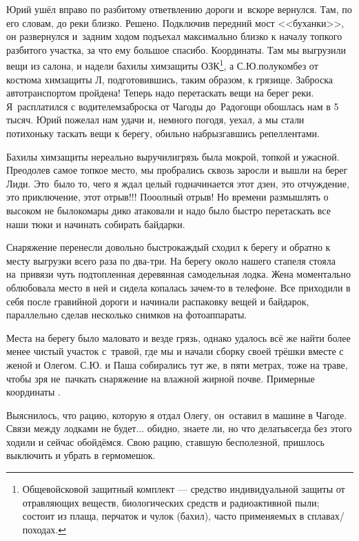 \renewcommand*{\thefootnote}{\fnsymbol{footnote}}
Юрий ушёл вправо по разбитому ответвлению дороги и~вскоре вернулся. Там, по его словам, до реки близко. Решено. Подключив передний мост <<буханки>>, он развернулся и~задним ходом подъехал максимально близко к началу топкого разбитого участка, за что ему большое спасибо. Координаты\mdash \CoordsLidSeventeenStapel. Там мы выгрузили вещи из салона, и надели бахилы химзащиты ОЗК\footnote[1]{Общевойсковой защитный комплект --- средство индивидуальной защиты от отравляющих веществ, биологических средств и радиоактивной пыли; состоит из плаща, перчаток и чулок (бахил), часто применяемых в сплавах/походах.}, а С.Ю.\mdash полукомбез от костюма химзащиты Л, подготовившись, таким образом, к грязище. Заброска автотранспортом пройдена! Теперь надо перетаскать вещи на берег реки. Я~расплатился с водителем\mdash заброска от Чагоды до~Радогощи обошлась нам в 5 тысяч. Юрий пожелал нам удачи и, немного погодя, уехал, а мы стали потихоньку таскать вещи к берегу, обильно набрызгавшись репеллентами.

Бахилы химзащиты нереально выручили\mdash грязь была мокрой, топкой и ужасной. Преодолев самое топкое место, мы пробрались сквозь заросли и вышли на берег Лиди. Это~было то, чего я ждал целый год\mdash начинается этот дзен, это отчуждение, это приключение, этот отрыв!!! По\sdash о\sdash олный отрыв! Но времени размышлять о высоком не было\mdash комары дико атаковали и надо было быстро перетаскать все наши тюки и начинать собирать байдарки. 

Снаряжение перенесли довольно быстро\mdash каждый сходил к берегу и обратно к месту выгрузки всего раза по два-три. На берегу около нашего стапеля стояла на~привязи чуть подтопленная деревянная самодельная лодка. Жена моментально облюбовала место в ней и сидела копалась зачем-то в телефоне. Все приходили в себя после гравийной дороги и начинали распаковку вещей и байдарок, параллельно сделав несколько снимков на фотоаппараты. 

Места на берегу было маловато и везде грязь, однако удалось всё же найти более менее чистый участок с~травой, где мы и начали сборку своей трёшки вместе с женой и Олегом. С.Ю. и Паша собирались тут же, в пяти метрах, тоже на траве, чтобы зря не~пачкать снаряжение на влажной жирной почве. Примерные координаты \CoordsLidSeventeenStapel.

Выяснилось, что рацию, которую я отдал Олегу, он~оставил в машине в Чагоде. Связи между лодками не будет$\ldots$ обидно, знаете ли, но что делать\mdash всегда без этого ходили и сейчас обойдёмся. Свою рацию, ставшую бесполезной, пришлось выключить и убрать в гермомешок.

